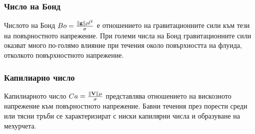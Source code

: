 \documentclass[bulgarian, 12pt]{article}
\begin{document}
\subsubsection{Число на Бонд}
Числото на Бонд $Bo = \frac{\norm{\mathbf{g}} \rho l^2 }{\sigma}$ е отношението на гравитационните сили към тези на повърностното напрежение.
При големи числа на Бонд гравитационните сили оказват много по-голямо влияние при течения около повърхността на флуида, отколкото повърхностното напрежение.
\subsubsection{Капилиарно число}
Капилиарното число $Ca = \frac{\norm{\mathbf{V}} \mu}{\sigma}$ представлява отношението на вискозното напрежение към повърностното напрежение.
Бавни течения през порести среди или тясни тръби се характеризират с ниски капилярни числа и образуване на мехурчета.
\end{document}
